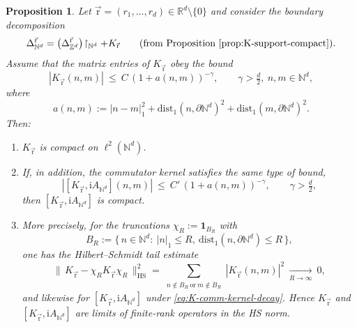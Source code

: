 \documentclass[10pt]{amsart}
\newcommand{\R}{{\mathbb{R}}}
\newcommand{\Z}{{\mathbb{Z}}}
\newcommand{\N}{{\mathbb{N}}}
\newcommand{\1}{{\mathbb{I}}}
\numberwithin{equation}{section}
\newtheorem{proposition}[theorem]{Proposition}%
\begin{document}
\begin{proposition}\label{prop:K-compactness-unified}
Let $\vec{\mathrm{r}}=(r_1,\dots,r_d)\in\R^d\setminus\{0\}$ and consider the boundary decomposition
\[
\Delta_{\N^d}^{\vec{\mathrm{r}}}
=\big(\Delta_{\Z^d}^{\vec{\mathrm{r}}}\big)\!\restriction_{\N^d}+K_{\vec{\mathrm{r}}}
\qquad\text{(from Proposition~\ref{prop:K-support-compact}).}
\]
Assume that the matrix entries of $K_{\vec{\mathrm{r}}}$ obey the bound
\begin{equation}\label{eq:K-kernel-decay}
|K_{\vec{\mathrm{r}}}(n,m)| \ \le\ C\,(1+a(n,m))^{-\gamma},\qquad
\gamma>\tfrac{d}{2},\ n,m\in\N^d,
\end{equation}
where
\[
a(n,m):=|n-m|_1^2+\mathrm{dist}_1(n,\partial\N^d)^2+\mathrm{dist}_1(m,\partial\N^d)^2.
\]
Then:
\begin{enumerate}
\item $K_{\vec{\mathrm{r}}}$ is compact on $\ell^2(\N^d)$.
\item If, in addition, the commutator kernel satisfies the same type of bound,
\begin{equation}\label{eq:K-comm-kernel-decay}
|[K_{\vec{\mathrm{r}}},\mathrm i A_{\N^d}](n,m)|
\ \le\ C'\,(1+a(n,m))^{-\gamma},\qquad \gamma>\tfrac{d}{2},
\end{equation}
then $[K_{\vec{\mathrm{r}}},\mathrm i A_{\N^d}]$ is compact.
\item More precisely, for the truncations $\chi_R:=\mathbf 1_{B_R}$ with
\[
B_R:=\{\,n\in\N^d:\ |n|_1\le R,\ \mathrm{dist}_1(n,\partial\N^d)\le R\,\},
\]
one has the Hilbert--Schmidt tail estimate
\begin{equation}\label{eq:HS-tail}
\|\,K_{\vec{\mathrm{r}}}-\chi_R K_{\vec{\mathrm{r}}}\chi_R\,\|_{\mathrm{HS}}^2
= \sum_{\substack{n\notin B_R\ \text{or}\ m\notin B_R}} |K_{\vec{\mathrm{r}}}(n,m)|^2
\ \xrightarrow[R\to\infty]{}\ 0,
\end{equation}
and likewise for $[K_{\vec{\mathrm{r}}},\mathrm i A_{\N^d}]$ under \eqref{eq:K-comm-kernel-decay}.
Hence $K_{\vec{\mathrm{r}}}$ and $[K_{\vec{\mathrm{r}}},\mathrm i A_{\N^d}]$ are limits of finite-rank operators in the HS norm.
\end{enumerate}
\end{proposition}
\end{document}
